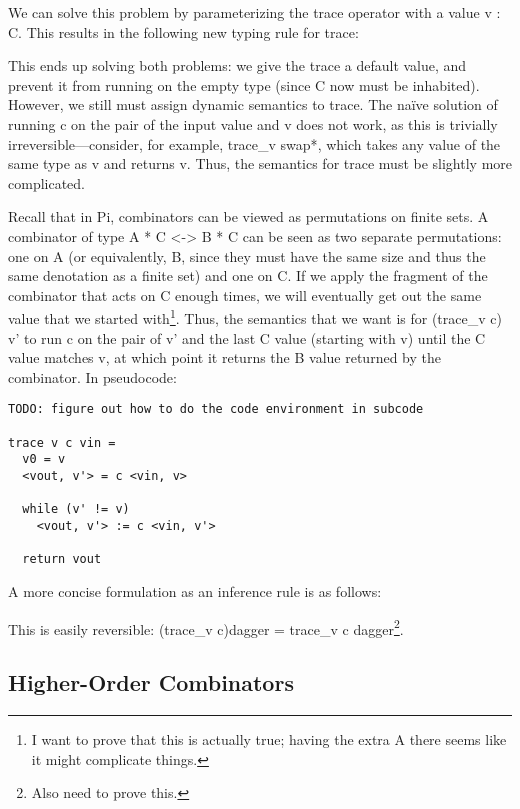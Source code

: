 \documentclass{llncs}
\begin{document}
We can solve this problem by parameterizing the trace operator with a value {{v
: C}}. This results in the following new typing rule for trace:


\noindent
This ends up solving both problems: we give the trace a default value, and
prevent it from running on the empty type (since {{C}} now must be inhabited).
However, we still must assign dynamic semantics to trace. The na\"ive solution
of running {{c}} on the pair of the input value and {{v}} does not work, as this
is trivially irreversible---consider, for example, {{trace_v swap*}}, which
takes any value of the same type as {{v}} and returns {{v}}. Thus, the semantics
for {{trace}} must be slightly more complicated.

Recall that in {{Pi}}, combinators can be viewed as permutations on finite sets.
A combinator of type {{A * C <-> B * C}} can be seen as two separate
permutations: one on {{A}} (or equivalently, B, since they must have the same
size and thus the same denotation as a finite set) and one on {{C}}. If we
apply the fragment of the combinator that acts on {{C}} enough times, we will
eventually get out the same value that we started with\footnote{I want to prove
that this is actually true; having the extra {{A}} there seems like it might
complicate things.}. Thus, the semantics that we want is for {{(trace_v c) v'}}
to run {{c}} on the pair of {{v'}} and the last {{C}} value (starting with
{{v}}) until the {{C}} value matches {{v}}, at which point it returns the {{B}}
value returned by the combinator. In pseudocode:

\begin{verbatim}
TODO: figure out how to do the code environment in subcode

trace v c vin =
  v0 = v
  <vout, v'> = c <vin, v>

  while (v' != v)
    <vout, v'> := c <vin, v'>

  return vout
\end{verbatim}

A more concise formulation as an inference rule is as follows:


This is easily reversible: {{(trace_v c)dagger = trace_v c
dagger}}\footnote{Also need to prove this.}.

\subsection{Higher-Order Combinators}
\end{document}
